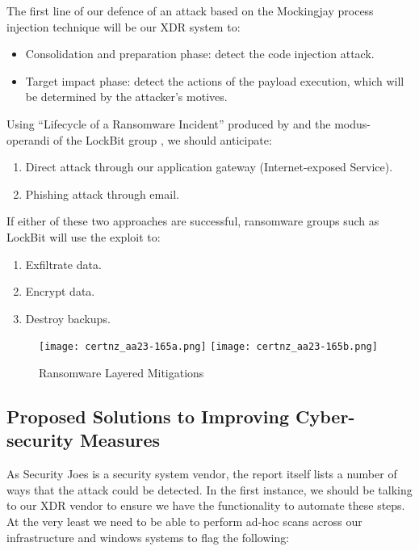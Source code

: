 The first line of our defence of an attack based on the Mockingjay process injection technique will be our XDR system to:
\begin{itemize}
\item Consolidation and preparation phase: detect the code injection attack.
\item Target impact phase: detect the actions of the payload execution, which will be determined by the attacker's motives.
\end{itemize}

Using ``Lifecycle of a Ransomware Incident'' produced by \autocite{Certnz:2021} and the modus-operandi of the LockBit
group \autocite{CISA:2023}, we should anticipate:

\begin{enumerate}
\item Direct attack through our application gateway (Internet-exposed Service).
\item Phishing attack through email.
\end{enumerate}

If either of these two approaches are successful, ransomware groups such as LockBit will use the exploit to:

\begin{enumerate}
\item Exfiltrate data.
\item Encrypt data.
\item Destroy backups.
\end{enumerate}


\begin{figure}[ht]
\texttt{[image: certnz\_aa23-165a.png]}
\texttt{[image: certnz\_aa23-165b.png]}
\caption{Ransomware Layered Mitigations \autocite{Certnz:2021}}
\end{figure}

\pagebreak

\subsection{Proposed Solutions to Improving Cyber-security Measures}

As Security Joes is a security system vendor, the report itself lists a number of ways that the attack could be detected. In
the first instance, we should be talking to our XDR vendor to ensure we have the functionality to automate these steps.  At
the very least we need to be able to perform ad-hoc scans across our infrastructure and windows systems to flag the following:

